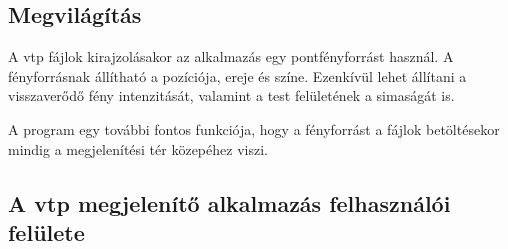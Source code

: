 \subsection{Megvilágítás}

A vtp fájlok kirajzolásakor az alkalmazás egy pontfényforrást használ. 
A fényforrásnak állítható a pozíciója, ereje és színe. 
Ezenkívül lehet állítani a visszaverődő fény intenzitását, 
valamint a test felületének a simaságát is.

A program egy további fontos funkciója, 
hogy a fényforrást a fájlok betöltésekor mindig 
a megjelenítési tér közepéhez viszi. 

\subsection{A vtp megjelenítő alkalmazás felhasználói felülete}

